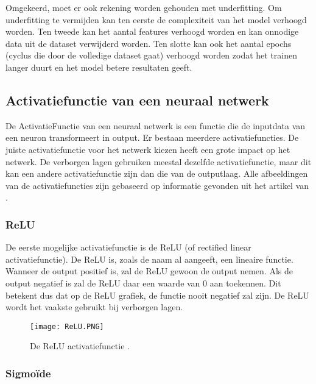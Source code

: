 Omgekeerd, moet er ook rekening worden gehouden met underfitting. Om underfitting te vermijden kan ten eerste de complexiteit van het model verhoogd worden. Ten tweede kan het aantal features verhoogd worden en kan onnodige data uit de dataset verwijderd worden. Ten slotte kan ook het aantal epochs (cyclus die door de volledige dataset gaat) verhoogd worden zodat het trainen langer duurt en het model betere resultaten geeft. \autocite{GeeksforGeeks2020}

\subsection{Activatiefunctie van een neuraal netwerk}
\label{sec:activatiefunctie}

De \gls{ActivatieFunctie} van een neuraal netwerk is een functie die de inputdata van een neuron transformeert in output. Er bestaan meerdere activatiefuncties. De juiste activatiefunctie voor het netwerk kiezen heeft een grote impact op het netwerk. De verborgen lagen gebruiken meestal dezelfde activatiefunctie, maar dit kan een andere activatiefunctie zijn dan die van de outputlaag. Alle afbeeldingen van de activatiefuncties zijn gebaseerd op informatie gevonden uit het artikel van \textcite{Brownlee2021}. 

\subsubsection{ReLU}
\label{sec:ReLU}

De eerste mogelijke activatiefunctie is de \gls{ReLU} (of rectified linear activatiefunctie). De ReLU is, zoals de naam al aangeeft, een lineaire functie. Wanneer de output positief is, zal de ReLU gewoon de output nemen. Als de output negatief is zal de ReLU daar een waarde van 0 aan toekennen. Dit betekent dus dat op de ReLU grafiek, de functie nooit negatief zal zijn. De ReLU wordt het vaakste gebruikt bij verborgen lagen. \autocite{Brownlee2021}

\begin{figure}[!htbp]
    \texttt{[image: ReLU.PNG]}
    \caption{\label{ReLU}De ReLU activatiefunctie \autocite{Brownlee2021}.}
\end{figure}
\FloatBarrier


\subsubsection{Sigmoïde}
\label{sec:sigmoide}

